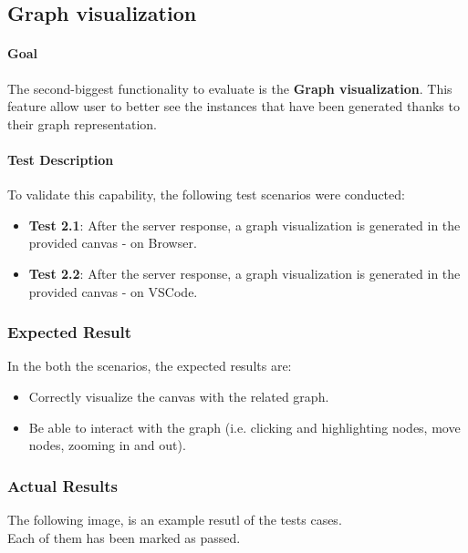 
\subsection{Graph visualization}

\paragraph{Goal}
The second-biggest functionality to evaluate is the \textbf{Graph visualization}. This feature allow user to better see the instances that have been generated thanks to their graph representation.

\paragraph{Test Description}
To validate this capability, the following test scenarios were conducted:
\begin{itemize}
    \item \textbf{Test 2.1}: After the server response, a graph visualization is generated in the provided canvas - on Browser. 
    \item \textbf{Test 2.2}: After the server response, a graph visualization is generated in the provided canvas - on VSCode. 
\end{itemize}

\subsubsection{Expected Result}

In the both the scenarios, the expected results are:
\begin{itemize}
    \item Correctly visualize the canvas with the related graph.
    \item Be able to interact with the graph (i.e. clicking and highlighting nodes, move nodes, zooming in and out).
\end{itemize}

\subsubsection{Actual Results}

The following image, is an example resutl of the tests cases.
\\
Each of them has been marked as passed.
\\


